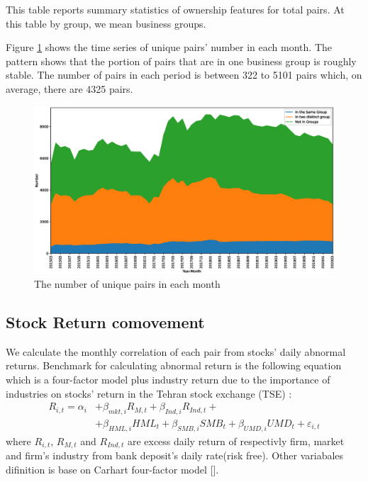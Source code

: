 \documentclass[12pt, a4paper]{article}
\begin{document}
  \begin{table}
  \centering
  \caption{ This table reports summary statistics of ownership features for total pairs. At this table by group, we mean business groups.}
  \label{t2-2}
    \resizebox{1\textwidth}{!}
          {
 
   }
    \end{table}%


 Figure \ref{g2-2} shows the time series of unique pairs' number in each month. The pattern shows that the portion of pairs that are in one business group is roughly stable. The number of pairs in each period is between 322 to 5101 pairs which, on average, there are 4325 pairs.
 
 \normalcolor
 
\begin{figure}[htbp]
\caption{ The number of unique pairs in each month}
\label{g2-2}
\includegraphics[width=\linewidth]{idMonth.eps}
\end{figure}
 
  \FloatBarrier
  
  
  
\subsection{Stock Return comovement}

We calculate the monthly correlation of each pair from stocks' daily abnormal returns. Benchmark for calculating abnormal return is the following equation which is a four-factor model plus industry return due to the importance of industries on stocks' return in the Tehran stock exchange (TSE) :
\begin{equation}
 \begin{split}
   R_{i,t} =\alpha _{i}&+\beta _{mkt,i}{\mathit {R}}_{M,t} + \beta_{Ind,i}{\mathit {R}}_{Ind,t} + \\
  &+\beta _{HML,i}{\mathit {HML}}_{t}+\beta _{SMB,i}{\mathit {SMB}}_{t}+\beta _{UMD,i}{\mathit {UMD}}_{t}+ \varepsilon_{i,t}
  \end{split}
     \label{e5Factor}
\end{equation}
where $ R_{i,t} $, $ R_{M,t} $ and $ R_{Ind,t} $ are excess daily return of respectivly  firm, market and firm's industry from bank deposit's daily rate(risk free). Other variabales difinition is base on Carhart four-factor model [\cite{Carhart4Factor}].
\end{document}
